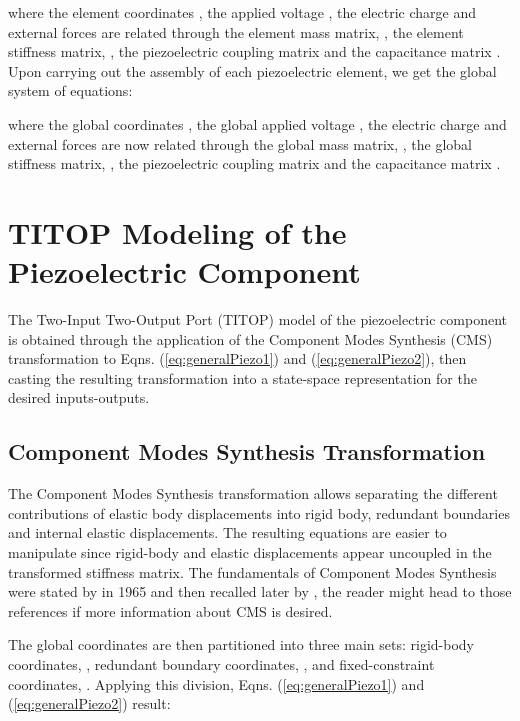 \documentclass{ifacconf}
\begin{document}
where the element coordinates , the applied voltage , the electric charge  and external forces   are related through the element mass matrix, , the element stiffness matrix, , the piezoelectric coupling matrix  and the capacitance matrix . Upon carrying out the assembly of each piezoelectric element, we get  the global system of equations:





where the global coordinates , the global applied voltage , the electric charge  and external forces  are now related through the global  mass matrix, , the global stiffness matrix, , the piezoelectric coupling matrix  and the capacitance matrix .

\section{TITOP Modeling of the Piezoelectric Component}
\label{sec:TITOPmodeling}

The Two-Input Two-Output Port (TITOP) model of the piezoelectric component is obtained through the application of the Component Modes Synthesis (CMS) transformation to Eqns. (\ref{eq:generalPiezo1}) and (\ref{eq:generalPiezo2}), then casting the resulting transformation into a state-space representation for the desired inputs-outputs.

\subsection{Component Modes Synthesis Transformation}
\label{subsec:CMS}

The Component Modes Synthesis transformation allows separating the different contributions of elastic body displacements into rigid body, redundant boundaries and internal elastic displacements. The resulting equations are easier to manipulate since rigid-body and elastic displacements appear uncoupled in the transformed stiffness matrix. The fundamentals of Component Modes Synthesis were stated by \cite{Hurty1965_CM} in 1965 and then recalled later by \cite{Craig2000_CB}, the reader might head to those references if more information about CMS is desired.

The global coordinates  are then partitioned into three main sets: rigid-body coordinates, , redundant boundary coordinates, , and fixed-constraint coordinates, . Applying this division, Eqns. (\ref{eq:generalPiezo1}) and (\ref{eq:generalPiezo2}) result:

\small
\end{document}
